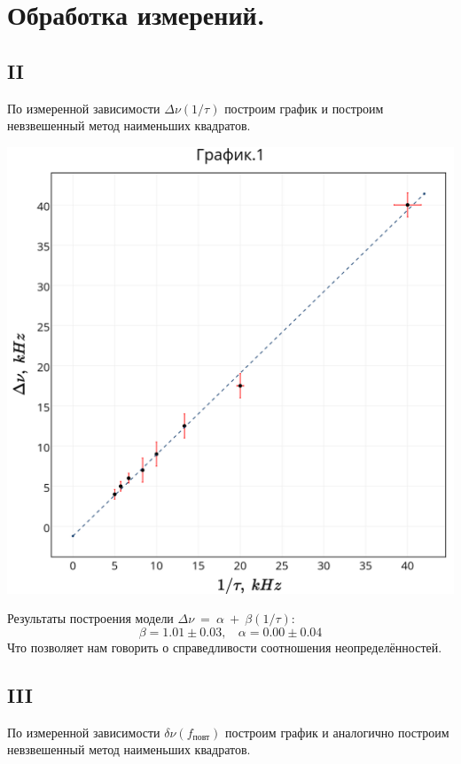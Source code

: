 \section{\label{sec:level1}Обработка измерений.}

\subsection{\label{sec:level2}II}

По измеренной зависимости $\Delta{\nu}(1/\tau)$ построим график и построим невзвешенный метод наименьших квадратов. 

\includegraphics[scale = 0.20]{my_plot1.png}

Результаты построения модели $\Delta{\nu}~=~\alpha~+~\beta(1/\tau)$:
$$ \beta = 1.01 \pm 0.03,~~~~
 \alpha = 0.00 \pm 0.04$$
Что позволяет нам говорить о справедливости соотношения неопределённостей. 

\subsection{\label{sec:level2}III}

По измеренной зависимости $\delta{\nu}(f_\text{повт})$ построим график и аналогично построим невзвешенный метод наименьших квадратов. 


